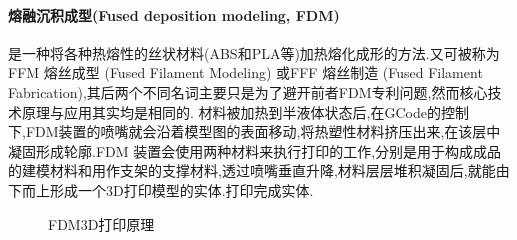 \documentclass[a4paper,12pt,onecolumn,twoside]{article}
\begin{document}
\paragraph{熔融沉积成型(Fused deposition modeling, FDM)}
是一种将各种热熔性的丝状材料(ABS和PLA等)加热熔化成形的方法.又可被称为FFM 熔丝成型 (Fused Filament Modeling) 或FFF 熔丝制造 (Fused Filament Fabrication),其后两个不同名词主要只是为了避开前者FDM专利问题,然而核心技术原理与应用其实均是相同的.
材料被加热到半液体状态后,在GCode的控制下,FDM装置的喷嘴就会沿着模型图的表面移动,将热塑性材料挤压出来,在该层中凝固形成轮廓.FDM 装置会使用两种材料来执行打印的工作,分别是用于构成成品的建模材料和用作支架的支撑材料,透过喷嘴垂直升降,材料层层堆积凝固后,就能由下而上形成一个3D打印模型的实体.打印完成实体.
\begin{figure}[ht]
\centering
{}
\caption{FDM3D打印原理}
\end{figure}
\end{document}
